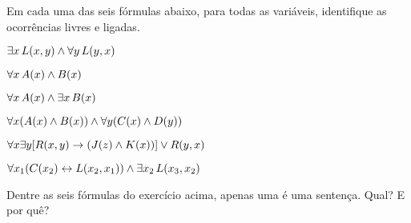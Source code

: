 \practiceproblems
\problempart
\label{pr.freeFOL}
Em cada uma das seis fórmulas abaixo, para todas as variáveis, identifique as ocorrências livres e ligadas.
\begin{earg}
\item $\exists x\, \mathord{L}(x,y) \wedge \forall y\, \mathord{L}(y,x)$
\item $\forall x\, \mathord{A}(x) \wedge \mathord{B}(x)$
\item $\forall x\, \mathord{A}(x) \wedge \exists x\, \mathord{B}(x)$
\item $\forall x (\mathord{A}(x) \wedge \mathord{B}(x)) \wedge \forall y(\mathord{C}(x) \wedge \mathord{D}(y))$
\item $\forall x\exists y[\mathord{R}(x,y) \rightarrow (\mathord{J}(z) \wedge \mathord{K}(x))] \vee \mathord{R}(y,x)$
\item $\forall x_1(\mathord{C}(x_2) \leftrightarrow \mathord{L}(x_2,x_1)) \wedge \exists x_2\,\mathord{L}(x_3,x_2)$
\end{earg}

\problempart
Dentre as seis fórmulas do exercício acima, apenas uma é uma sentença.
Qual? E por quê?
